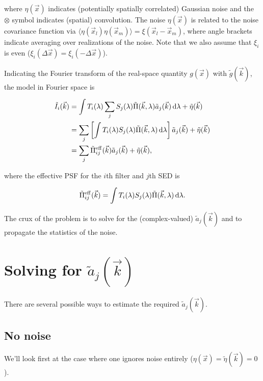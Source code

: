 \documentclass{article}
\begin{document}
where $\eta(\vec{x})$ indicates (potentially spatially correlated) Gaussian noise and the $\otimes$
symbol indicates (spatial) convolution.  The noise $\eta(\vec{x})$ is related to the noise
covariance function via $\langle\eta(\vec{x}_l) \eta(\vec{x}_m)\rangle = \xi(\vec{x}_l -
\vec{x}_m)$, where angle brackets indicate averaging over realizations of the noise.  Note that we
also assume that $\xi_i$ is even ($\xi_i(\Delta\vec{x}) = \xi_i(-\Delta\vec{x})$).

Indicating the Fourier transform of the real-space quantity $g(\vec{x})$ with $\tilde{g}(\vec{k})$,
the model in Fourier space is

\begin{align}
    \tilde{I}_i(\vec{k})
    &= \int T_i(\lambda) \sum_j S_j(\lambda) \tilde{\Pi}(\vec{k}, \lambda) \tilde{a}_j(\vec{k}) \dif{\lambda} + \tilde{\eta}(\vec{k}) \\
    &= \sum_j \left[\int T_i(\lambda) S_j(\lambda) \tilde{\Pi}(\vec{k}, \lambda) \dif{\lambda}\right] \tilde{a}_j(\vec{k}) + \tilde{\eta}(\vec{k}) \\
    \label{eqn:solveme}
    &=  \sum_j \tilde{\Pi}^\mathrm{eff}_{ij}(\vec{k}) \tilde{a}_j(\vec{k}) + \tilde{\eta}(\vec{k}),
\end{align}

where the effective PSF for the $i$th filter and $j$th SED is

\begin{equation}
  \tilde{\Pi}^\mathrm{eff}_{ij}(\vec{k}) = \int T_i(\lambda) S_j(\lambda) \tilde{\Pi}(\vec{k}, \lambda) \dif{\lambda}.
\end{equation}

The crux of the problem is to solve for the (complex-valued) $\tilde{a}_j(\vec{k})$ and to propagate
the statistics of the noise.

\section{Solving for $\tilde{a}_j(\vec{k})$}

There are several possible ways to estimate the required $\tilde{a}_j(\vec{k})$.

\subsection{No noise}

We'll look first at the case where one ignores noise entirely ($\eta(\vec{x}) =
\tilde{\eta}(\vec{k})= 0$).
\end{document}
